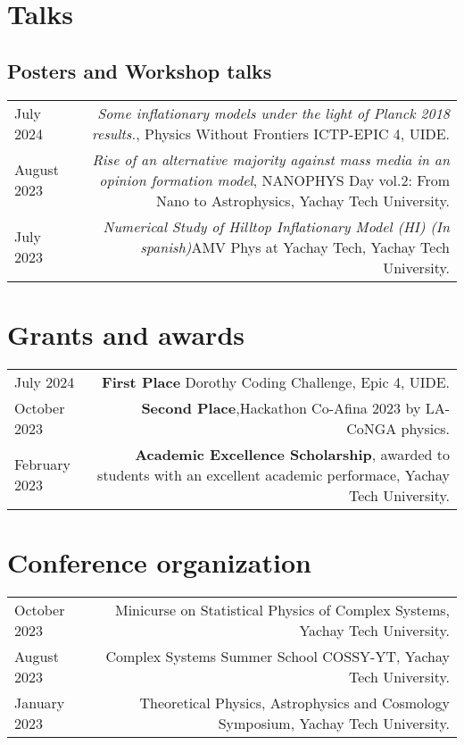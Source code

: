 \documentclass{article}
\begin{document}
\section*{Talks}
\subsection*{Posters and Workshop talks}
\begin{tabular}{L!{\vrule}R}

    July 2024 & \textit{Some inflationary models under the light of Planck 2018 results.}, Physics Without Frontiers ICTP-EPIC 4, UIDE. \\

    August 2023 & \textit{Rise of an alternative majority against mass media in an opinion formation model}, NANOPHYS Day vol.2: From Nano to Astrophysics, Yachay Tech University. \\

    July 2023 & \textit{Numerical Study of Hilltop Inflationary Model (HI) (In spanish)}AMV Phys at Yachay Tech, Yachay Tech University. \\

    

\end{tabular}


\section*{Grants and awards}

\begin{tabular}{L!{\vrule}R}
    July 2024 & \textbf{First Place} Dorothy Coding Challenge, Epic 4, UIDE. \\
    October 2023 & \textbf{Second Place},Hackathon Co-Afina 2023 by LA-CoNGA physics. \\
    February 2023 & \textbf{Academic Excellence Scholarship}, awarded to students with an excellent academic performace, Yachay Tech University. \\
    
\end{tabular}


\section*{Conference organization}

\begin{tabular}{L!{\vrule}R}
  October 2023  & Minicurse on Statistical Physics of Complex Systems, Yachay Tech University. \\
  August 2023  & Complex Systems Summer School COSSY-YT, Yachay Tech University. \\
  January 2023 & Theoretical Physics, Astrophysics and Cosmology Symposium, Yachay Tech University.\\
\end{tabular}
\end{document}
